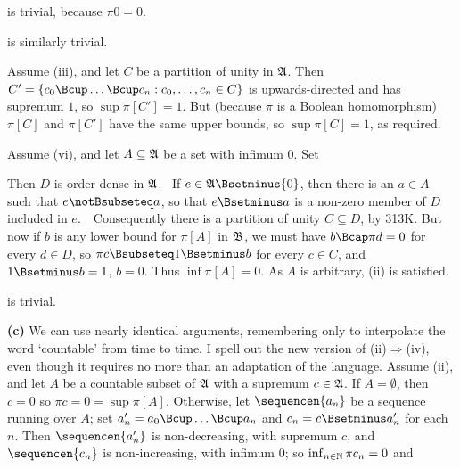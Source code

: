 {\medskip

 is trivial, because $\pi 0=0$.

\medskip

 is similarly trivial.

\medskip

 Assume (iii), and let $C$ be a
partition of unity in $\frak A$.   Then
$C'=\{c_0\Bcup\ldots\Bcup c_n:c_0,\ldots,c_n\in C\}$ is upwards-directed
and has supremum $1$, so $\sup\pi[C']=1$.   But (because $\pi$ is a
Boolean homomorphism) $\pi[C]$ and $\pi[C']$ have the same upper bounds,
so $\sup\pi[C]=1$, as required.

\medskip

 Assume (vi), and let
$A\subseteq\frak A$ be a set with infimum $0$.   Set


\noindent Then $D$ is order-dense in $\frak A$.   \Prf\ If $e\in\frak
A\Bsetminus\{0\}$, then there is an $a\in A$ such that $e\notBsubseteq
a$, so that $e\Bsetminus a$ is a non-zero member of $D$ included in
$e$.\ \QeD\  Consequently there is a partition of unity $C\subseteq D$,
by 313K.   But now if $b$ is any lower bound for
$\pi[A]$ in $\frak B$, we must have $b\Bcap\pi d=0$ for every $d\in D$,
so $\pi c\Bsubseteq 1\Bsetminus b$ for every $c\in C$, and
$1\Bsetminus b=1$, $b=0$.   Thus $\inf\pi[A]=0$.   As $A$ is arbitrary,
(ii) is satisfied.

\medskip

 is trivial.

\medskip

{\bf (c)} We can use nearly identical arguments, remembering only to
interpolate the word `countable' from time to time.   I spell out
the new version of (ii)$\Rightarrow$(iv), even though it requires no
more than an adaptation of the language.  Assume (ii), and let $A$ be a
countable subset of $\frak A$ with a supremum $c\in\frak A$.   If
$A=\emptyset$, then $c=0$ so $\pi c=0=\sup\pi[A]$.   Otherwise, let
$\sequencen{a_n}$ be a sequence running over $A$;  set
$a'_n=a_0\Bcup\ldots\Bcup a_n$ and $c_n=c\Bsetminus a'_n$ for each $n$.
Then $\sequencen{a'_n}$ is non-decreasing, with supremum $c$, and
$\sequencen{c_n}$ is non-increasing, with infimum $0$;  so
$\inf_{n\in\Bbb N}\pi c_n=0$ and


}
